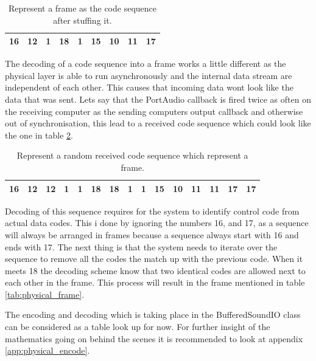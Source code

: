	\begin{table}[!h]
		\begin{center}
			\begin{tabular}{|c|c|c|c|c|c|c|c|c|}
			\hline
			16 & 12 & 1 & 18 & 1 & 15 & 10 & 11 & 17 \\
			\hline
			\end{tabular}
		\end{center}
		\caption{Represent a frame as the code sequence after stuffing it.}
		\label{tab:physical_stuffed_frame}
	\end{table}
	
	The decoding of a code sequence into a frame works a little different as the physical layer is able to run asynchronously and the internal data stream are independent of each other. This causes that incoming data wont look like the data that was sent. Lets say that the PortAudio callback is fired twice as often on the receiving computer as the sending computers output callback and otherwise out of synchronisation, this lead to a received code sequence which could look like the one in table \ref{tab:physical_received_frame}.
	
	\begin{table}[!h]
		\begin{center}
			\begin{tabular}{|c|c|c|c|c|c|c|c|c|c|c|c|c|c|c|}
			\hline
			16 & 12 & 12 & 1 & 1 & 18 & 18 & 1 & 1 & 15 & 10 & 11 & 11 & 17 & 17 \\
			\hline
			\end{tabular}
		\end{center}
		\caption{Represent a random received code sequence which represent a frame.}
		\label{tab:physical_received_frame}
	\end{table}
	
	Decoding of this sequence requires for the system to identify control code from actual data codes. This i done by ignoring the numbers 16, and 17, as a sequence will always be arranged in frames because a sequence always start with 16 and ends with 17. The next thing is that the system needs to iterate over the sequence to remove all the codes the match up with the previous code. When it meets 18 the decoding scheme know that two identical codes are allowed next to each other in the frame. This process will result in the frame mentioned in table \ref{tab:physical_frame}.
	
	The encoding and decoding which is taking place in the BufferedSoundIO class can be considered as a table look up for now. For further insight of the mathematics going on behind the scenes it is recommended to look at appendix \ref{app:physical_encode}.
